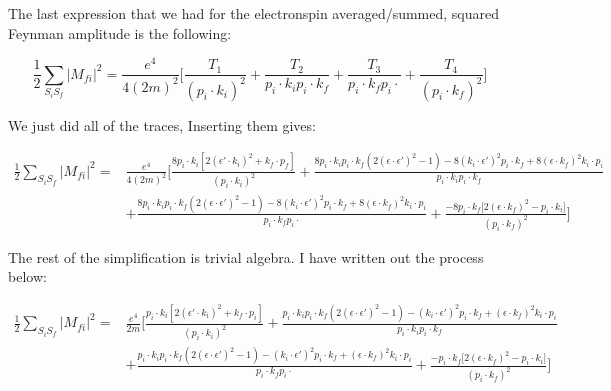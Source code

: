 \documentclass[a4]{article}
\begin{document}
    The last expression that we had for the electronspin averaged/summed, squared Feynman amplitude is the following:

    \begin{equation}
        \frac{1}{2} \sum_{S_i S_f} |M_{fi}|^2 = \frac{e^4}{4 (2m)^2} \Bigg[ \frac{T_1}{(p_i \cdot k_i)^2} + \frac{T_2}{p_i \cdot k_i p_i \cdot k_f} + \frac{T_3}{p_i \cdot k_f p_i \cdot} + \frac{T_4}{(p_i \cdot k_f)^2} \Bigg]
    \end{equation}
    
    We just did all of the traces, Inserting them gives:

    \begin{equation}
        \begin{aligned}
            \frac{1}{2} \sum_{S_i S_f} |M_{fi}|^2 = & \frac{e^4}{4 (2m)^2} \Bigg[ \frac{8 p_i \cdot k_i [2 (\epsilon' \cdot k_i)^2 + k_f \cdot p_f]}{(p_i \cdot k_i)^2} + \frac{8 p_i \cdot k_i p_i \cdot k_f (2 (\epsilon \cdot \epsilon')^2 - 1) - 8 (k_i \cdot \epsilon')^2 p_i \cdot k_f + 8 (\epsilon \cdot k_f)^2 k_i \cdot p_i}{p_i \cdot k_i p_i \cdot k_f} \\
            & + \frac{8 p_i \cdot k_i p_i \cdot k_f (2 (\epsilon \cdot \epsilon')^2 - 1) - 8 (k_i \cdot \epsilon')^2 p_i \cdot k_f + 8 (\epsilon \cdot k_f)^2 k_i \cdot p_i}{p_i \cdot k_f p_i \cdot} + \frac{- 8 p_i \cdot k_f \big[ 2 (\epsilon \cdot k_f)^2 - p_i \cdot k_i \big]}{(p_i \cdot k_f)^2} \Bigg]
        \end{aligned}
    \end{equation}

    The rest of the simplification is trivial algebra. I have written out the process below:

    \begin{equation}
        \begin{aligned}
            \frac{1}{2} \sum_{S_i S_f} |M_{fi}|^2 = & \frac{e^4}{2m} \Bigg[ \frac{p_i \cdot k_i [2 (\epsilon' \cdot k_i)^2 + k_f \cdot p_i]}{(p_i \cdot k_i)^2} + \frac{p_i \cdot k_i p_i \cdot k_f (2 (\epsilon \cdot \epsilon')^2 - 1) - (k_i \cdot \epsilon')^2 p_i \cdot k_f + (\epsilon \cdot k_f)^2 k_i \cdot p_i}{p_i \cdot k_i p_i \cdot k_f} \\
            & + \frac{p_i \cdot k_i p_i \cdot k_f (2 (\epsilon \cdot \epsilon')^2 - 1) - (k_i \cdot \epsilon')^2 p_i \cdot k_f + (\epsilon \cdot k_f)^2 k_i \cdot p_i}{p_i \cdot k_f p_i \cdot} + \frac{- p_i \cdot k_f \big[ 2 (\epsilon \cdot k_f)^2 - p_i \cdot k_i \big]}{(p_i \cdot k_f)^2} \Bigg]
        \end{aligned}
    \end{equation}
\end{document}
